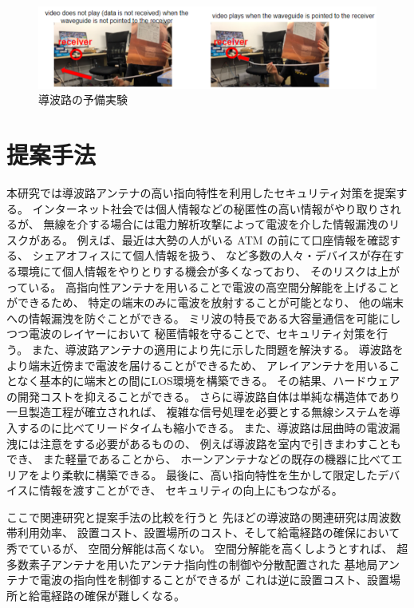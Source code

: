 \documentclass[technicalreport]{ieicej}
\begin{document}
\begin{figure}[t]
  \begin{center}
    \includegraphics[bb=0 0 630.087950 152.271255, width=1.0\linewidth]{img/qualitative_experiment.pdf}
    \caption{導波路の予備実験}
    \label{fig:qualitative_experiment}
  \end{center}
\end{figure}


\section{提案手法}

本研究では導波路アンテナの高い指向特性を利用したセキュリティ対策を提案する。
インターネット社会では個人情報などの秘匿性の高い情報がやり取りされるが、
無線を介する場合には電力解析攻撃によって電波を介した情報漏洩のリスクがある。
例えば、最近は大勢の人がいる ATM の前にて口座情報を確認する、
シェアオフィスにて個人情報を扱う、
など多数の人々・デバイスが存在する環境にて個人情報をやりとりする機会が多くなっており、
そのリスクは上がっている。
高指向性アンテナを用いることで電波の高空間分解能を上げることができるため、
特定の端末のみに電波を放射することが可能となり、
他の端末への情報漏洩を防ぐことができる。
ミリ波の特長である大容量通信を可能にしつつ電波のレイヤーにおいて
秘匿情報を守ることで、セキュリティ対策を行う。
また、導波路アンテナの適用により先に示した問題を解決する。
導波路をより端末近傍まで電波を届けることができるため、
アレイアンテナを用いることなく基本的に端末との間にLOS環境を構築できる。
その結果、ハードウェアの開発コストを抑えることができる。
さらに導波路自体は単純な構造体であり一旦製造工程が確立されれば、
複雑な信号処理を必要とする無線システムを導入するのに比べてリードタイムも縮小できる。
また、導波路は屈曲時の電波漏洩には注意をする必要があるものの、
例えば導波路を室内で引きまわすこともでき、
また軽量であることから、
ホーンアンテナなどの既存の機器に比べてエリアをより柔軟に構築できる。
最後に、高い指向特性を生かして限定したデバイスに情報を渡すことができ、
セキュリティの向上にもつながる。

ここで関連研究と提案手法の比較を行うと
先ほどの導波路の関連研究は周波数帯利用効率、
設置コスト、設置場所のコスト、そして給電経路の確保において秀でているが、
空間分解能は高くない。
空間分解能を高くしようとすれば、
超多数素子アンテナを用いたアンテナ指向性の制御や分散配置された
基地局アンテナで電波の指向性を制御することができるが
これは逆に設置コスト、設置場所と給電経路の確保が難しくなる。
\end{document}
